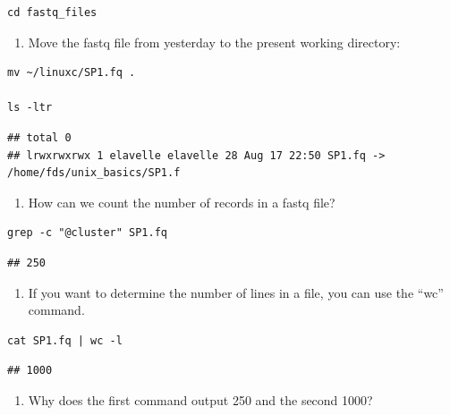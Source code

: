 \documentclass[
]{book}
\providecommand{\tightlist}{%
  \setlength{\itemsep}{0pt}\setlength{\parskip}{0pt}}
\begin{document}
\begin{verbatim}
cd fastq_files
\end{verbatim}

\begin{enumerate}
\def\labelenumi{\arabic{enumi})}
\setcounter{enumi}{4}
\tightlist
\item
  Move the fastq file from yesterday to the present working directory:
\end{enumerate}

\begin{verbatim}
mv ~/linuxc/SP1.fq .

ls -ltr
\end{verbatim}

\begin{verbatim}
## total 0
## lrwxrwxrwx 1 elavelle elavelle 28 Aug 17 22:50 SP1.fq -> /home/fds/unix_basics/SP1.f
\end{verbatim}

\begin{enumerate}
\def\labelenumi{\arabic{enumi})}
\setcounter{enumi}{5}
\tightlist
\item
  How can we count the number of records in a fastq file?
\end{enumerate}

\begin{verbatim}
grep -c "@cluster" SP1.fq
\end{verbatim}

\begin{verbatim}
## 250
\end{verbatim}

\begin{enumerate}
\def\labelenumi{\arabic{enumi})}
\setcounter{enumi}{6}
\tightlist
\item
  If you want to determine the number of lines in a file, you can use the ``wc'' command.
\end{enumerate}

\begin{verbatim}
cat SP1.fq | wc -l
\end{verbatim}

\begin{verbatim}
## 1000
\end{verbatim}

\begin{enumerate}
\def\labelenumi{\arabic{enumi})}
\setcounter{enumi}{7}
\tightlist
\item
  Why does the first command output 250 and the second 1000?
\end{enumerate}
\end{document}

